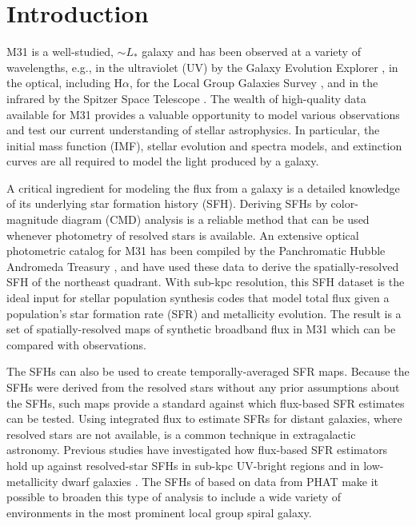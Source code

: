 \section{Introduction}

M31 is a well-studied, $\sim L_\ast$ galaxy and has been observed at a variety
of wavelengths, e.g., in the ultraviolet (UV) by the Galaxy Evolution Explorer
\citep[GALEX;][]{Morrissey:2007}, in the optical, including H$\alpha$, for the
Local Group Galaxies Survey \citep{Massey:2006}, and in the infrared by the
Spitzer Space Telescope \citep{Gordon:2006}. The wealth of high-quality data
available for M31 provides a valuable opportunity to model various observations
and test our current understanding of stellar astrophysics. In particular, the
initial mass function (IMF), stellar evolution and spectra models, and
extinction curves are all required to model the light produced by a galaxy.

A critical ingredient for modeling the flux from a galaxy is a detailed
knowledge of its underlying star formation history (SFH). Deriving SFHs by
color-magnitude diagram (CMD) analysis is a reliable method that can be used
whenever photometry of resolved stars is available. An extensive optical
photometric catalog for M31 has been compiled by the Panchromatic Hubble
Andromeda Treasury \citep[PHAT][]{Dalcanton:2012}, and \citet{Lewis:2014} have
used these data to derive the spatially-resolved SFH of the northeast quadrant.
With sub-kpc resolution, this SFH dataset is the ideal input for stellar
population synthesis codes that model total flux given a population's star
formation rate (SFR) and metallicity evolution. The result is a set of
spatially-resolved maps of synthetic broadband flux in M31 which can be
compared with observations.

The \citet{Lewis:2014} SFHs can also be used to create temporally-averaged SFR
maps. Because the SFHs were derived from the resolved stars without any prior
assumptions about the SFHs, such maps provide a standard against which
flux-based SFR estimates \citep[e.g., using any of the calibrations
from][]{Kennicutt:2012} can be tested. Using integrated flux to estimate SFRs
for distant galaxies, where resolved stars are not available, is a common
technique in extragalactic astronomy. Previous studies have investigated how
flux-based SFR estimators hold up against resolved-star SFHs in sub-kpc
UV-bright regions \citep{Simones:2014} and in low-metallicity dwarf galaxies
\citep{McQuinn:2014}. The SFHs of \citet{Lewis:2014} based on data from PHAT
make it possible to broaden this type of analysis to include a wide variety of
environments in the most prominent local group spiral galaxy.

